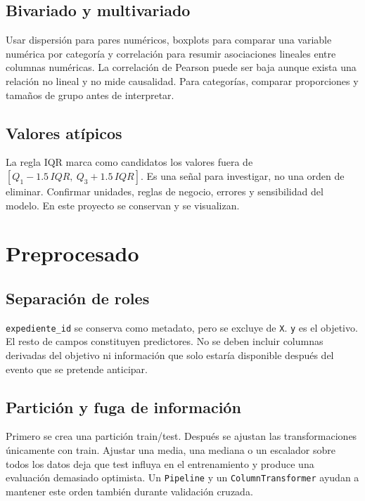 \documentclass[11pt,a4paper]{article}
\begin{document}
\subsection{Bivariado y multivariado}
Usar dispersión para pares numéricos, boxplots para comparar una variable numérica por categoría y correlación para resumir asociaciones lineales entre columnas numéricas. La correlación de Pearson puede ser baja aunque exista una relación no lineal y no mide causalidad. Para categorías, comparar proporciones y tamaños de grupo antes de interpretar.
\subsection{Valores atípicos}
La regla IQR marca como candidatos los valores fuera de $[Q_1-1.5\,IQR,\ Q_3+1.5\,IQR]$. Es una señal para investigar, no una orden de eliminar. Confirmar unidades, reglas de negocio, errores y sensibilidad del modelo. En este proyecto se conservan y se visualizan.
\section{Preprocesado}
\subsection{Separación de roles}
\texttt{expediente\_id} se conserva como metadato, pero se excluye de \texttt{X}. \texttt{y} es el objetivo. El resto de campos constituyen predictores. No se deben incluir columnas derivadas del objetivo ni información que solo estaría disponible después del evento que se pretende anticipar.
\subsection{Partición y fuga de información}
Primero se crea una partición train/test. Después se ajustan las transformaciones únicamente con train. Ajustar una media, una mediana o un escalador sobre todos los datos deja que test influya en el entrenamiento y produce una evaluación demasiado optimista. Un \texttt{Pipeline} y un \texttt{ColumnTransformer} ayudan a mantener este orden también durante validación cruzada.
\end{document}
